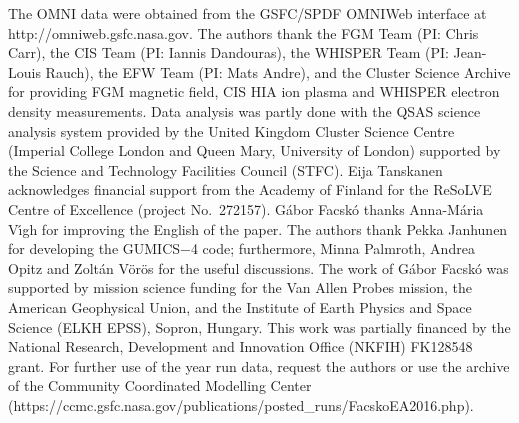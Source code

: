 \documentclass[draft]{agujournal2019}
\begin{document}
\acknowledgments
The OMNI data were obtained from the GSFC/SPDF OMNIWeb interface at http://omniweb.gsfc.nasa.gov. The authors thank the FGM Team (PI: Chris Carr), the CIS Team (PI: Iannis Dandouras), the WHISPER Team (PI: Jean-Louis Rauch), the EFW Team (PI: Mats Andre), and the Cluster Science Archive for providing FGM magnetic field, CIS HIA ion plasma and WHISPER electron density measurements. Data analysis was partly done with the QSAS science analysis system provided by the United Kingdom Cluster Science Centre (Imperial College London and Queen Mary, University of London) supported by the Science and Technology Facilities Council (STFC). Eija Tanskanen acknowledges financial support from the Academy of Finland for the ReSoLVE Centre of Excellence (project No.~272157). G{\'a}bor Facsk{\'o} thanks Anna-M\'aria V{\'\i{}}gh for improving the English of the paper. The authors thank Pekka Janhunen for developing the GUMICS$-$4 code; furthermore, Minna Palmroth, Andrea Opitz and Zolt{\'a}n V{\"o}r{\"o}s for the useful discussions. The work of G{\'a}bor Facsk{\'o} was supported by mission science funding for the Van Allen Probes mission, the American Geophysical Union, and the Institute of Earth Physics and Space Science (ELKH EPSS), Sopron, Hungary. This work was partially financed by the National Research, Development and Innovation Office (NKFIH) FK128548 grant. For further use of the year run data, request the authors or use the archive of the Community Coordinated Modelling Center (https://ccmc.gsfc.nasa.gov/publications/posted\_runs/FacskoEA2016.php).





\pagebreak
\end{document}
